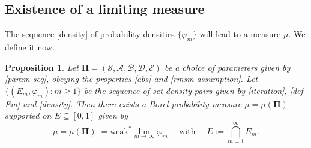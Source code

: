 \documentclass[12pt, twoside]{article}
\newtheorem{proposition}[theorem]{Proposition}
\theoremstyle{definition}
\numberwithin{equation}{section}
\begin{document}
\subsection{Existence of a limiting measure} \label{measure-definition-section} 
The sequence \eqref{density} of probability densities $\{\varphi_{m}\}$ will lead to a measure $\mu$. We define it now. 
\begin{proposition} \label{def-mu-prop}  
Let $\pmb{\Pi} = (\mathcal S, \mathcal A, \mathcal B, \mathcal D, \mathcal E)$ be a choice of parameters given by \eqref{param-seq}, obeying the properties  \eqref{abs} and \eqref{rmsm-assumption}. Let  $\{(E_m, \varphi_m): m \geq 1 \}$ be the sequence of set-density pairs given by \eqref{iteration}, \eqref{def-Em} and \eqref{density}. Then there exists a Borel probability measure $\mu = \mu(\pmb{\Pi})$ supported on $E \subseteq [0,1]$ given by 
\begin{equation}
\mu = \mu(\pmb{\Pi}) := \text{weak}^{\ast} \lim_{m \rightarrow \infty} \varphi_m \quad \text{ with } \quad  E := \bigcap_{m=1}^{\infty} E_m.  \label{mu-weak-limit}
\end{equation} 
\end{proposition}
\vskip0.1in     
\end{document}
